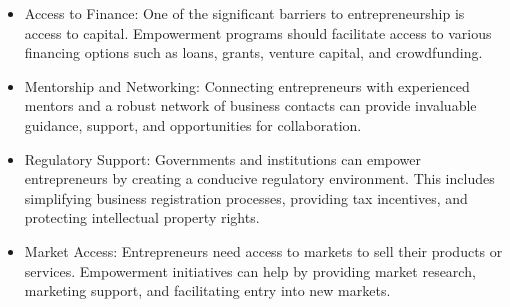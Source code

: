 \begin{enumerate}
\begin{itemize}
        \item Access to Finance: One of the significant barriers to entrepreneurship is access to capital. Empowerment programs should facilitate access to various financing options such as loans, grants, venture capital, and crowdfunding.

        \item Mentorship and Networking: Connecting entrepreneurs with experienced mentors and a robust network of business contacts can provide invaluable guidance, support, and opportunities for collaboration.

        \item Regulatory Support: Governments and institutions can empower entrepreneurs by creating a conducive regulatory environment. This includes simplifying business registration processes, providing tax incentives, and protecting intellectual property rights.

        \item Market Access: Entrepreneurs need access to markets to sell their products or services. Empowerment initiatives can help by providing market research, marketing support, and facilitating entry into new markets. 
    \end{itemize}
\end{enumerate}